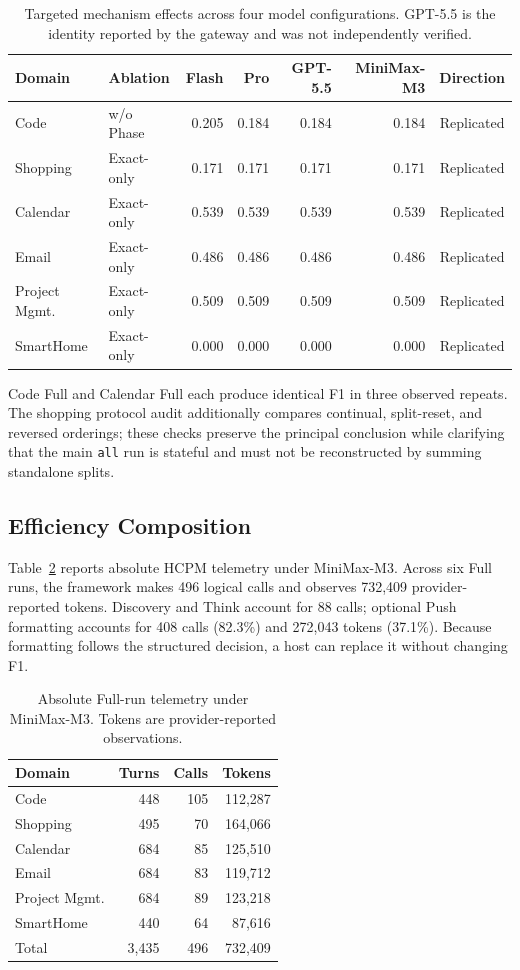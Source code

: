 \documentclass[sigconf,anonymous,review]{acmart}
\newcommand{\system}{HCPM}
\begin{document}
\begin{table}[t]
\centering
\caption{Targeted mechanism effects across four model configurations. GPT-5.5 is the identity reported by the gateway and was not independently verified.}
\label{tab:models}
\small
\begin{tabular}{llrrrrc}
\toprule
Domain & Ablation & Flash & Pro & GPT-5.5 & MiniMax-M3 & Direction \\
\midrule
Code & w/o Phase & 0.205 & 0.184 & 0.184 & 0.184 & Replicated \\
Shopping & Exact-only & 0.171 & 0.171 & 0.171 & 0.171 & Replicated \\
Calendar & Exact-only & 0.539 & 0.539 & 0.539 & 0.539 & Replicated \\
Email & Exact-only & 0.486 & 0.486 & 0.486 & 0.486 & Replicated \\
Project Mgmt. & Exact-only & 0.509 & 0.509 & 0.509 & 0.509 & Replicated \\
SmartHome & Exact-only & 0.000 & 0.000 & 0.000 & 0.000 & Replicated \\
\bottomrule
\end{tabular}
\end{table}

Code Full and Calendar Full each produce identical F1 in three observed repeats.
The shopping protocol audit additionally compares continual, split-reset, and reversed orderings; these checks preserve the principal conclusion while clarifying that the main \texttt{all} run is stateful and must not be reconstructed by summing standalone splits.

\subsection{Efficiency Composition}
\label{sec:efficiency}

Table~\ref{tab:efficiency} reports absolute \system{} telemetry under MiniMax-M3.
Across six Full runs, the framework makes 496 logical calls and observes 732,409 provider-reported tokens.
Discovery and Think account for 88 calls; optional Push formatting accounts for 408 calls (82.3\%) and 272,043 tokens (37.1\%).
Because formatting follows the structured decision, a host can replace it without changing F1.

\begin{table}[t]
\centering
\caption{Absolute Full-run telemetry under MiniMax-M3. Tokens are provider-reported observations.}
\label{tab:efficiency}
\small
\begin{tabular}{lrrr}
\toprule
Domain & Turns & Calls & Tokens \\
\midrule
Code & 448 & 105 & 112,287 \\
Shopping & 495 & 70 & 164,066 \\
Calendar & 684 & 85 & 125,510 \\
Email & 684 & 83 & 119,712 \\
Project Mgmt. & 684 & 89 & 123,218 \\
SmartHome & 440 & 64 & 87,616 \\
\midrule
Total & 3,435 & 496 & 732,409 \\
\bottomrule
\end{tabular}
\end{table}
\end{document}
